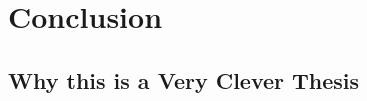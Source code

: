 
\chapter{Conclusion}
\label{cha:conclusion}

\section{Why this is a Very Clever Thesis}
\label{sec:why}

